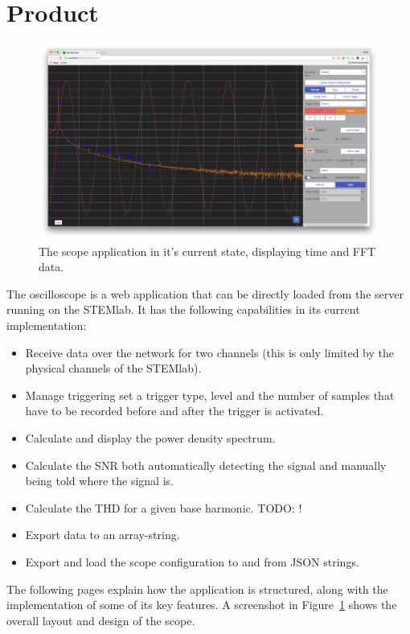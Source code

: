
%
%

\section{Product} %
\label{sec:gui:product}

\begin{figure}
    \centering
    \includegraphics[width=1\textwidth]{images/gui/scope}
    \caption[The scope application]{%
        The scope application in it's current state, displaying time and FFT data.%
    }
    \label{fig:gui:screenshot}
\end{figure}

The oscilloscope  is a web  application that can  be directly loaded  from the
server  running on  the  STEMlab. It  has the  following  capabilities in  its
current implementation:
\begin{itemize}\tightlist
    \item 
        Receive data over  the network for two channels (this  is only limited
        by the physical channels of the STEMlab).
    \item 
        Manage triggering set a trigger type,  level and the number of samples
        that have to be recorded before and after the trigger is activated.
    \item 
        Calculate and display the power density spectrum.
    \item 
        Calculate the SNR both automatically detecting the signal and manually
        being told where the signal is.
    \item 
        Calculate the THD for a given base harmonic. TODO: !
    \item 
        Export data to an array-string.
    \item 
        Export and load the scope configuration to and from JSON strings.
\end{itemize}
The  following  pages  explain  how   the  application  is  structured,  along
with  the  implementation  of  some  of  its  key  features. A  screenshot  in
Figure~\ref{fig:gui:screenshot}  shows the  overall layout  and design  of the
scope.


